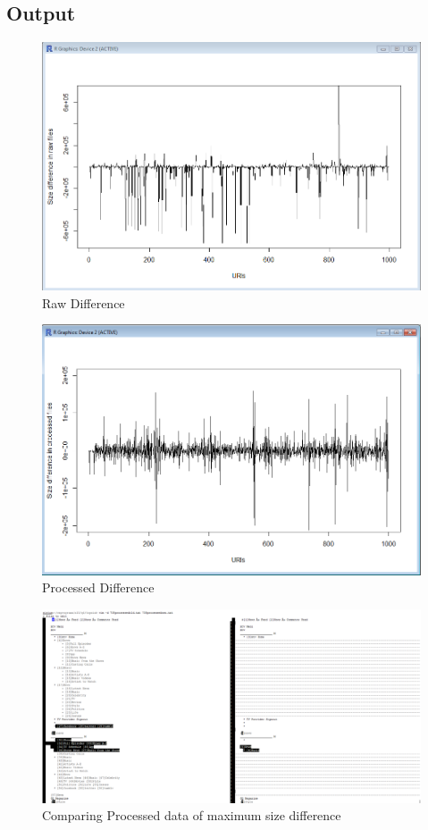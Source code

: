 \documentclass[12pt]{article}
\begin{document}
\subsection{Output}

\begin{figure}[ht]
\includegraphics[scale=0.7]{../../q4/rawoutput.png}
\centering
\caption{Raw Difference}
\label{fig:Initial graph}
\end{figure}
\newpage
\begin{figure}[ht]
\includegraphics[scale=0.7]{../../q4/processedoutput.png}
\centering
\caption{Processed Difference}
\label{fig:Initial graph}
\end{figure}
\newpage
\begin{figure}[ht]
\includegraphics[scale=0.5]{../../q4/735oldvsnew.png}
\centering
\caption{Comparing Processed data of maximum size difference}
\label{fig:Initial graph}
\end{figure}
\end{document}
